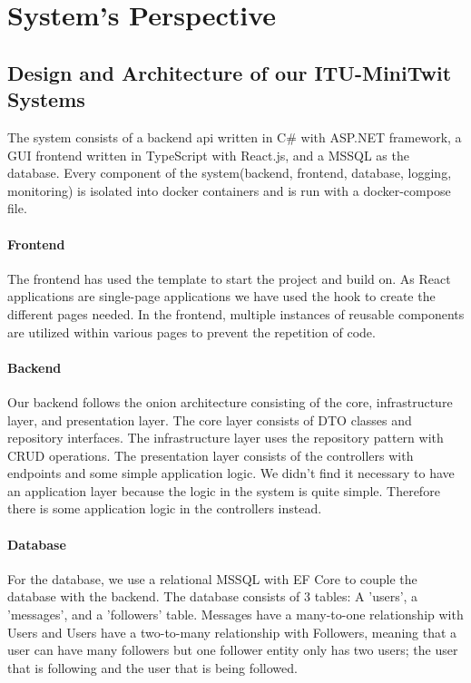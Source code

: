 \chapter{System's Perspective}

\section{Design and Architecture of our ITU-MiniTwit Systems}
The system consists of a backend api written in C\# with ASP.NET framework, a GUI frontend written in TypeScript with React.js, and a \gls{MSSQL} as the database.
Every component of the system(backend, frontend, database, logging, monitoring) is isolated into docker containers and is run with a docker-compose file.


\subsubsection{Frontend}
The frontend has used the  template to start the project and build on. As React applications are single-page applications we have used the  hook to create the different pages needed. 
In the frontend, multiple instances of reusable components are utilized within various pages to prevent the repetition of code.

\subsubsection{Backend}
Our backend follows the onion architecture consisting of the core, infrastructure layer, and presentation layer. The core layer consists of \gls{DTO} classes and repository interfaces. The infrastructure layer uses the repository pattern with \gls{CRUD} operations.
The presentation layer consists of the controllers with endpoints and some simple application logic. We didn't find it necessary to have an application layer because the logic in the system is quite simple. Therefore there is some application logic in the controllers instead.


\subsubsection{Database}
For the database, we use a relational \gls{MSSQL} with \gls{EF} Core to couple the database with the backend.
The database consists of 3 tables: A 'users', a 'messages', and a 'followers' table.
Messages have a many-to-one relationship with Users and Users have a two-to-many relationship with Followers, meaning that a user can have many followers but one follower entity only has two users; the user that is following and the user that is being followed.

